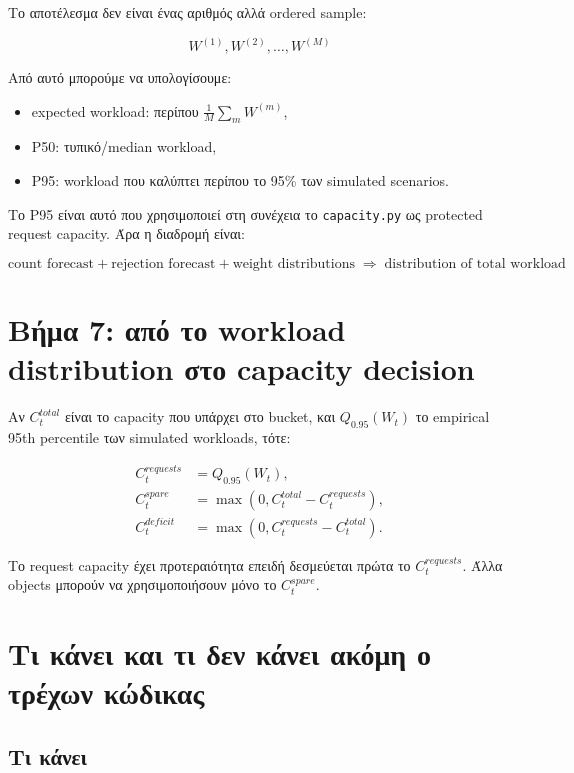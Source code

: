 \documentclass[11pt,a4paper]{article}
\newcommand{\equationnote}[1]{
  \begin{center}
    \colorbox{boxblue}{\parbox{0.92\linewidth}{\begin{equation*}#1\end{equation*}}}
  \end{center}
}
\newcommand{\code}[1]{\texttt{#1}}
\begin{document}
Το αποτέλεσμα δεν είναι ένας αριθμός αλλά ordered sample:

\equationnote{W^{(1)},W^{(2)},\ldots,W^{(M)}}

Από αυτό μπορούμε να υπολογίσουμε:

\begin{itemize}
  \item expected workload: περίπου $\frac{1}{M}\sum_m W^{(m)}$,
  \item P50: τυπικό/median workload,
  \item P95: workload που καλύπτει περίπου το 95\% των simulated scenarios.
\end{itemize}

Το P95 είναι αυτό που χρησιμοποιεί στη συνέχεια το \code{capacity.py} ως
protected request capacity. Άρα η διαδρομή είναι:

\equationnote{
  \text{count forecast} + \text{rejection forecast} +
  \text{weight distributions}
  \;\Longrightarrow\;
  \text{distribution of total workload}
}

\section{Βήμα 7: από το workload distribution στο capacity decision}

Αν $C_t^{total}$ είναι το capacity που υπάρχει στο bucket, και
$Q_{0.95}(W_t)$ το empirical 95th percentile των simulated workloads, τότε:

\begin{align*}
  C_t^{requests} &= Q_{0.95}(W_t),\\
  C_t^{spare} &= \max(0,C_t^{total}-C_t^{requests}),\\
  C_t^{deficit} &= \max(0,C_t^{requests}-C_t^{total}).
\end{align*}

Το request capacity έχει προτεραιότητα επειδή δεσμεύεται πρώτα το
$C_t^{requests}$. Άλλα objects μπορούν να χρησιμοποιήσουν μόνο το
$C_t^{spare}$.

\section{Τι κάνει και τι δεν κάνει ακόμη ο τρέχων κώδικας}

\subsection{Τι κάνει}
\end{document}
